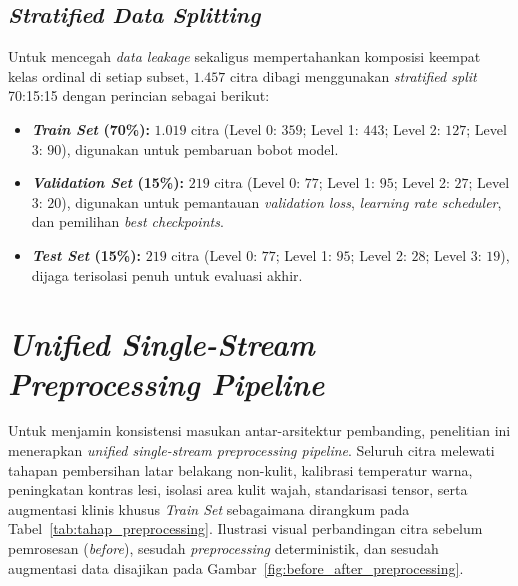 \subsection{\textit{Stratified Data Splitting}}
Untuk mencegah \textit{data leakage} sekaligus mempertahankan komposisi keempat kelas ordinal di setiap subset, $1.457$ citra dibagi menggunakan \textit{stratified split} 70:15:15 dengan perincian sebagai berikut:
\begin{itemize}
    \item \textbf{\textit{Train Set} (70\%):} $1.019$ citra (Level 0: $359$; Level 1: $443$; Level 2: $127$; Level 3: $90$), digunakan untuk pembaruan bobot model.
    \item \textbf{\textit{Validation Set} (15\%):} $219$ citra (Level 0: $77$; Level 1: $95$; Level 2: $27$; Level 3: $20$), digunakan untuk pemantauan \textit{validation loss}, \textit{learning rate scheduler}, dan pemilihan \textit{best checkpoints}.
    \item \textbf{\textit{Test Set} (15\%):} $219$ citra (Level 0: $77$; Level 1: $95$; Level 2: $28$; Level 3: $19$), dijaga terisolasi penuh untuk evaluasi akhir.
\end{itemize}

\section{\textit{Unified Single-Stream Preprocessing Pipeline}}
\label{sec:pipa_praproses}

Untuk menjamin konsistensi masukan antar-arsitektur pembanding, penelitian ini menerapkan \textit{unified single-stream preprocessing pipeline}. Seluruh citra melewati tahapan pembersihan latar belakang non-kulit, kalibrasi temperatur warna, peningkatan kontras lesi, isolasi area kulit wajah, standarisasi tensor, serta augmentasi klinis khusus \textit{Train Set} sebagaimana dirangkum pada Tabel~\ref{tab:tahap_preprocessing}. Ilustrasi visual perbandingan citra sebelum pemrosesan (\textit{before}), sesudah \textit{preprocessing} deterministik, dan sesudah augmentasi data disajikan pada Gambar~\ref{fig:before_after_preprocessing}.

